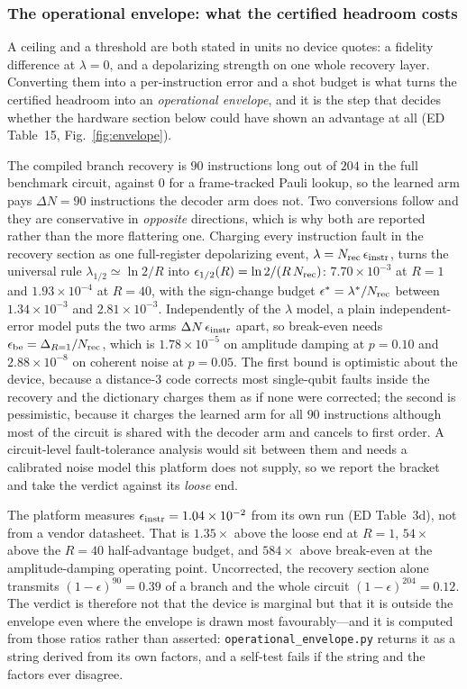 \documentclass[aps,prxquantum,reprint,superscriptaddress]{revtex4-2}
\begin{document}
\subsubsection*{The operational envelope: what the certified headroom costs}

A ceiling and a threshold are both stated in units no device quotes: a fidelity
difference at $\lambda=0$, and a depolarizing strength on one whole recovery layer.
Converting them into a per-instruction error and a shot budget is what turns the
certified headroom into an \emph{operational envelope}, and it is the step that
decides whether the hardware section below could have shown an advantage at all
(ED Table~15, Fig.~\ref{fig:envelope}).

The compiled branch recovery is $90$ instructions long out of $204$ in the full
benchmark circuit, against $0$ for a frame-tracked Pauli lookup, so the learned arm
pays $\Delta N=90$ instructions the decoder arm does not. Two conversions follow and
they are conservative in \emph{opposite} directions, which is why both are reported
rather than the more flattering one. Charging every instruction fault in the recovery
section as one full-register depolarizing event, $\lambda=N_{\rm rec}\,
\epsilon_{\rm instr}$, turns the universal rule $\lambda_{1/2}\simeq\ln2/R$ into
$\epsilon_{1/2}(R)=\ln2/(R\,N_{\rm rec})$: $7.70\times10^{-3}$ at $R=1$ and
$1.93\times10^{-4}$ at $R=40$, with the sign-change budget
$\epsilon^*=\lambda^*/N_{\rm rec}$ between $1.34\times10^{-3}$ and
$2.81\times10^{-3}$. Independently of the $\lambda$ model, a plain independent-error
model puts the two arms $\Delta N\,\epsilon_{\rm instr}$ apart, so break-even needs
$\epsilon_{\rm be}=\Delta_{R=1}/N_{\rm rec}$, which is $1.78\times10^{-5}$ on
amplitude damping at $p=0.10$ and $2.88\times10^{-8}$ on coherent noise at $p=0.05$.
The first bound is optimistic about the device, because a distance-$3$ code corrects
most single-qubit faults inside the recovery and the dictionary charges them as if
none were corrected; the second is pessimistic, because it charges the learned arm
for all $90$ instructions although most of the circuit is shared with the decoder
arm and cancels to first order. A circuit-level fault-tolerance analysis would sit
between them and needs a calibrated noise model this platform does not supply, so we
report the bracket and take the verdict against its \emph{loose} end.

The platform measures $\epsilon_{\rm instr}=1.04\times10^{-2}$ from its own run
(ED Table~3d), not from a vendor datasheet. That is $1.35\times$ above the loose end
at $R=1$, $54\times$ above the $R=40$ half-advantage budget, and $584\times$ above
break-even at the amplitude-damping operating point. Uncorrected, the recovery
section alone transmits $(1-\epsilon)^{90}=0.39$ of a branch and the whole circuit
$(1-\epsilon)^{204}=0.12$. The verdict is therefore not that the device is marginal
but that it is outside the envelope even where the envelope is drawn most
favourably---and it is computed from those ratios rather than asserted:
\texttt{operational\_envelope.py} returns it as a string derived from its own
factors, and a self-test fails if the string and the factors ever disagree.
\end{document}
